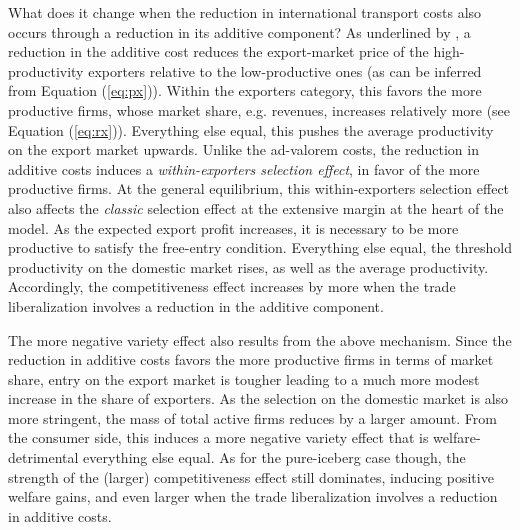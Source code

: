 \documentclass[a4paper,11pt]{article}
\begin{document}
What does it change when the reduction in international transport costs also occurs through a reduction in its additive component? As underlined by \cite{sorensen2014}, a reduction in the additive cost reduces the export-market price of the high-productivity exporters relative to the low-productive ones (as can be inferred from Equation (\ref{eq:px})). Within the exporters category, this favors the more productive firms, whose market share, e.g. revenues, increases relatively more (see Equation (\ref{eq:rx})). Everything else equal, this pushes the average productivity on the export market upwards. Unlike the ad-valorem costs, the reduction in additive costs induces a \textit{within-exporters selection effect}, in favor of the more productive firms. At the general equilibrium, this within-exporters selection effect also affects the \textit{classic} selection effect at the extensive margin at the heart of the \cite{melitz} model. As the expected export profit increases, it is necessary to be more productive to satisfy the free-entry condition. Everything else equal, the threshold productivity on the domestic market rises, as well as the average productivity. Accordingly, the competitiveness effect increases by more when the trade liberalization involves a reduction in the additive component.

The more negative variety effect also results from the above mechanism. Since the reduction in additive costs favors the more productive firms in terms of market share, entry on the export market is tougher leading to a much more modest increase in the share of exporters. As the selection on the domestic market is also more stringent, the mass of total active firms reduces by a larger amount. From the consumer side, this induces a more negative variety effect that is welfare-detrimental everything else equal. As for the pure-iceberg case though, the strength of the (larger) competitiveness effect still dominates, inducing positive welfare gains, and even larger when the trade liberalization involves a reduction in additive costs.
\end{document}
